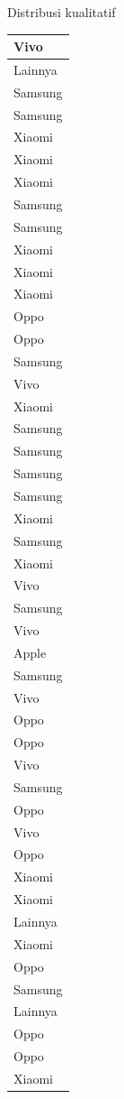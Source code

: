\documentclass[
  ignorenonframetext,
]{beamer}
\begin{document}
\begin{frame}[s]{Distribusi kualitatif}
\begin{table}
\begin{tabular}[t]{l}
\hline
Vivo\\
\hline
Lainnya\\
\hline
Samsung\\
\hline
Samsung\\
\hline
Xiaomi\\
\hline
Xiaomi\\
\hline
Xiaomi\\
\hline
Samsung\\
\hline
Samsung\\
\hline
Xiaomi\\
\hline
Xiaomi\\
\hline
Xiaomi\\
\hline
Oppo\\
\hline
Oppo\\
\hline
Samsung\\
\hline
Vivo\\
\hline
Xiaomi\\
\hline
Samsung\\
\hline
Samsung\\
\hline
Samsung\\
\hline
Samsung\\
\hline
Xiaomi\\
\hline
Samsung\\
\hline
Xiaomi\\
\hline
Vivo\\
\hline
Samsung\\
\hline
Vivo\\
\hline
Apple\\
\hline
Samsung\\
\hline
Vivo\\
\hline
Oppo\\
\hline
Oppo\\
\hline
Vivo\\
\hline
Samsung\\
\hline
Oppo\\
\hline
Vivo\\
\hline
Oppo\\
\hline
Xiaomi\\
\hline
Xiaomi\\
\hline
Lainnya\\
\hline
Xiaomi\\
\hline
Oppo\\
\hline
Samsung\\
\hline
Lainnya\\
\hline
Oppo\\
\hline
Oppo\\
\hline
Xiaomi\\

\end{tabular}
\end{table}
\end{frame}
\end{document}
